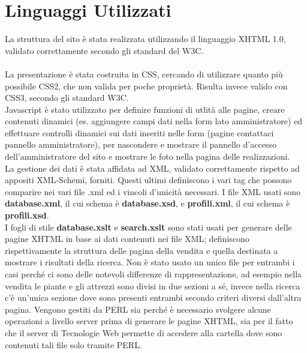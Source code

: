 \section{Linguaggi Utilizzati}{
	La struttura del sito è stata realizzata utilizzando il linguaggio XHTML 1.0, validato correttamente secondo gli standard del W3C. \\
	\\
	La presentazione è stata costruita in CSS, cercando di utilizzare quanto più possibile CSS2, che non valida per poche proprietà. Risulta invece valido con CSS3, secondo gli standard W3C.
	\\
	Javascript è stato utilizzato per definire funzioni di utlità alle pagine, creare contenuti dinamici (es. aggiungere campi dati nella form lato amministratore) ed effettuare controlli dinamici sui dati inseriti nelle form (pagine contattaci pannello amministratore), per nascondere e mostrare il pannello d'accesso dell'amministratore del sito e mostrare le foto nella pagina delle realizzazioni.
	\\
	La gestione dei dati è stata affidata ad XML, validato correttamente rispetto ad appositi XML-Schemi, forniti. Questi ultimi definiscono i vari tag che possono comparire nei vari file .xml ed i vincoli d'unicità necessari. I file XML usati sono \textbf{database.xml}, il cui schema è \textbf{database.xsd}, e \textbf{profili.xml}, il cui schema è \textbf{profili.xsd}.\\
	I fogli di stile \textbf{database.xslt} e \textbf{search.xslt} sono stati usati per generare delle pagine XHTML in base ai dati contenuti nei file XML; definiscono rispettivamente la struttura delle pagina della vendita e quella destinata a mostrare i risultati della ricerca. Non è stato usato un unico file per entrambi i casi perché ci sono delle notevoli differenze di rappresentazione, ad esempio nella vendita le piante e gli attrezzi sono divisi in due sezioni a sé, invece nella ricerca c'è un'unica sezione dove sono presenti entrambi secondo criteri diversi dall'altra pagina.
	Vengono gestiti da PERL sia perché è necessario svolgere alcune operazioni a livello server prima di generare le pagine XHTML, sia per il fatto che il server di Tecnologie Web permette di accedere alla cartella dove sono contenuti tali file solo tramite PERL.
	\\
}

